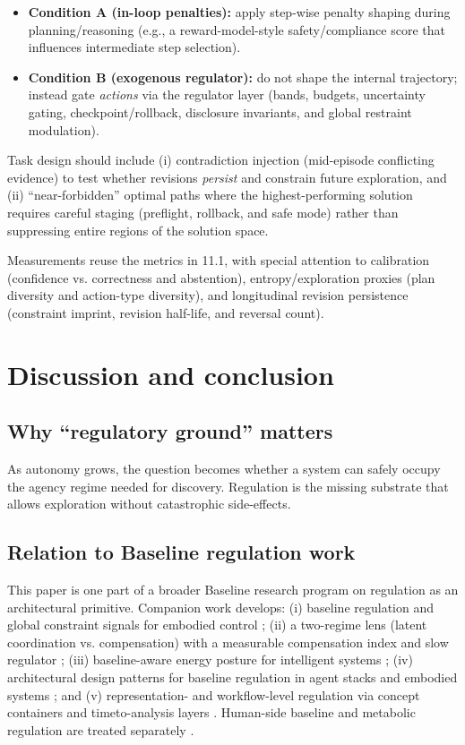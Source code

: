 \documentclass[11pt]{article}
\begin{document}
\begin{itemize}
\item \textbf{Condition A (in-loop penalties):} apply step-wise penalty shaping during planning/reasoning (e.g., a
reward-model-style safety/compliance score that influences intermediate step selection).
\item \textbf{Condition B (exogenous regulator):} do not shape the internal trajectory; instead gate \emph{actions} via
the regulator layer (bands, budgets, uncertainty gating, checkpoint/rollback, disclosure invariants, and global restraint modulation).
\end{itemize}

Task design should include (i) contradiction injection (mid-episode conflicting evidence) to test whether revisions
\emph{persist} and constrain future exploration, and (ii) ``near-forbidden'' optimal paths where the highest-performing
solution requires careful staging (preflight, rollback, and safe mode) rather than suppressing entire regions of the solution space.

Measurements reuse the metrics in 11.1, with special attention to calibration (confidence vs. correctness and abstention),
entropy/exploration proxies (plan diversity and action-type diversity), and longitudinal revision persistence (constraint imprint,
revision half-life, and reversal count).

\section{Discussion and conclusion}
\subsection{Why “regulatory ground” matters}
As autonomy grows, the question becomes whether a system can safely occupy the agency regime
needed for discovery. Regulation is the missing substrate that allows exploration without catastrophic
side-effects.
\subsection{Relation to Baseline regulation work}
This paper is one part of a broader Baseline research program on regulation as an architectural
primitive. Companion work develops: (i) baseline regulation and global constraint signals for
embodied control \citep{jeffreys2025baseline_constraint}; (ii) a two-regime lens (latent coordination vs. compensation) with a measurable
compensation index and slow regulator \citep{jeffreys2026two_regime_control}; (iii) baseline-aware energy posture for intelligent systems
\citep{jeffreys2026waste_energy}; (iv) architectural design patterns for baseline regulation in agent stacks and embodied systems
\citep{jeffreys2025patterns_agent_llm,jeffreys2025patterns_embodied}; and (v) representation- and workflow-level regulation via concept containers and timeto-analysis layers \citep{jeffreys2026concept_containers,jeffreys2026time_to_analysis}. Human-side baseline and metabolic regulation are treated separately
\citep{jeffreys2026coherent_human,jeffreys2026lower_metabolic}.
\end{document}
